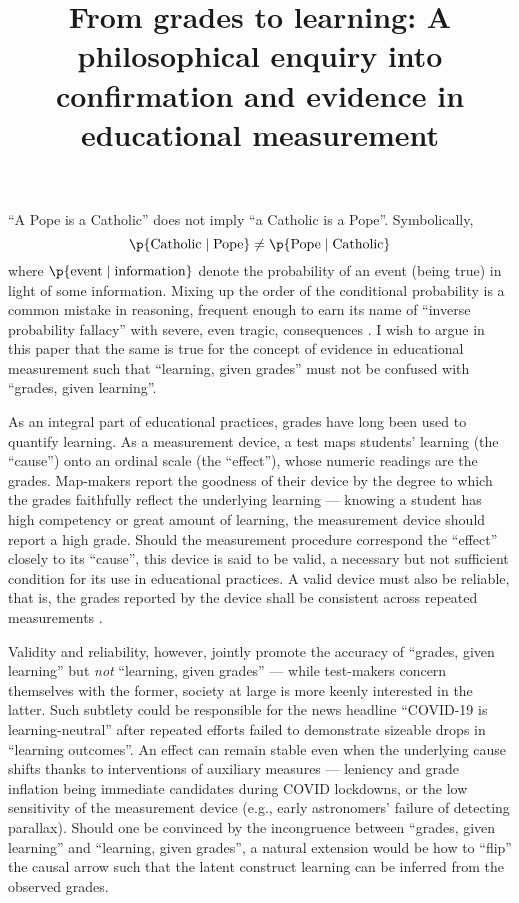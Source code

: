 \documentclass[
    a4paper,                %
    11pt,                   %
    stu,                    %
    floatsintext,           %
    biblatex,               %
    colorlinks=true,        %
    linkcolor=red,          %
    anchorcolor=black,      %
    citecolor=blue,         %
    urlcolor=blue,          %
    bookmarks=true,         %
    bookmarksopen=false,    %
    bookmarksnumbered=true, %
    dvipsnames              %
]{apa7}
\title{From grades to learning: A philosophical enquiry into\\
confirmation and evidence in educational measurement}
\begin{document}
\maketitle

``A Pope is a Catholic'' does not imply ``a Catholic is a Pope''. Symbolically,
\[ \p{ \text{Catholic} \mid \text{Pope} } \neq \p{ \text{Pope} \mid \text{Catholic} } \]
where $\p{ \text{event} \mid \text{information} }$ denote the probability of an event (being true) in light of some information. Mixing up the order of the conditional probability is a common mistake in reasoning, frequent enough to earn its name of ``inverse probability fallacy'' \parencite{kalinowski:2008} with severe, even tragic, consequences \parencite{hill:2005, thompson:1987}. I wish to argue in this paper that the same is true for the concept of evidence in educational measurement such that ``learning, given grades'' must not be confused with ``grades, given learning''.

As an integral part of educational practices, grades have long been used to quantify learning. As a measurement device, a test maps students' learning (the ``cause'') onto an ordinal scale (the ``effect''), whose numeric readings are the grades. Map-makers report the goodness of their device by the degree to which the grades faithfully reflect the underlying learning --- knowing a student has high competency or great amount of learning, the measurement device should report a high grade. Should the measurement procedure correspond the ``effect'' closely to its ``cause'', this device is said to be valid, a necessary but not sufficient condition for its use in educational practices. A valid device must also be reliable, that is, the grades reported by the device shall be consistent across repeated measurements \parencite{standards:2014}.

Validity and reliability, however, jointly promote the accuracy of ``grades, given learning'' but \emph{not} ``learning, given grades'' --- while test-makers concern themselves with the former, society at large is more keenly interested in the latter. Such subtlety could be responsible for the news headline ``COVID-19 is learning-neutral'' after repeated efforts failed to demonstrate sizeable drops in ``learning outcomes''. An effect can remain stable even when the underlying cause shifts thanks to interventions of auxiliary measures --- leniency and grade inflation being immediate candidates during COVID lockdowns, or the low sensitivity of the measurement device (e.g., early astronomers' failure of detecting parallax). Should one be convinced by the incongruence between ``grades, given learning'' and ``learning, given grades'', a natural extension would be how to ``flip'' the causal arrow such that the latent construct learning can be inferred from the observed grades.
\end{document}
